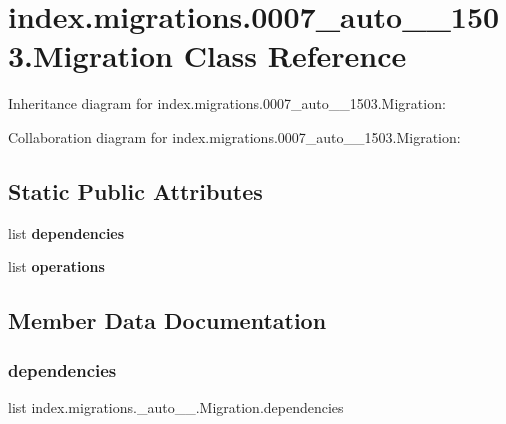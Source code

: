 \hypertarget{classindex_1_1migrations_1_10007__auto__20171011__1503_1_1Migration}{}\section{index.\+migrations.0007\+\_\+auto\+\_\+\_\+1503.Migration Class Reference}
\label{classindex_1_1migrations_1_10007__auto__20171011__1503_1_1Migration}


Inheritance diagram for index.\+migrations.0007\+\_\+auto\+\_\+\_\+1503.Migration\+:


Collaboration diagram for index.\+migrations.0007\+\_\+auto\+\_\+\_\+1503.Migration\+:
\subsection*{Static Public Attributes}
\begin{DoxyCompactItemize}
\item 
list {\bfseries dependencies}
\item 
list {\bfseries operations}
\end{DoxyCompactItemize}


\subsection{Member Data Documentation}
\mbox{\label{classindex_1_1migrations_1_10007__auto__20171011__1503_1_1Migration_ae1cfba9e49c0e186047100542b118acc}} 
\subsubsection{\texorpdfstring{dependencies}{dependencies}}
{\footnotesize\ttfamily list index.\+migrations.\+\_\+auto\+\_\+\_.\+Migration.\+dependencies\hspace{0.3cm}{\ttfamily [static]}}

